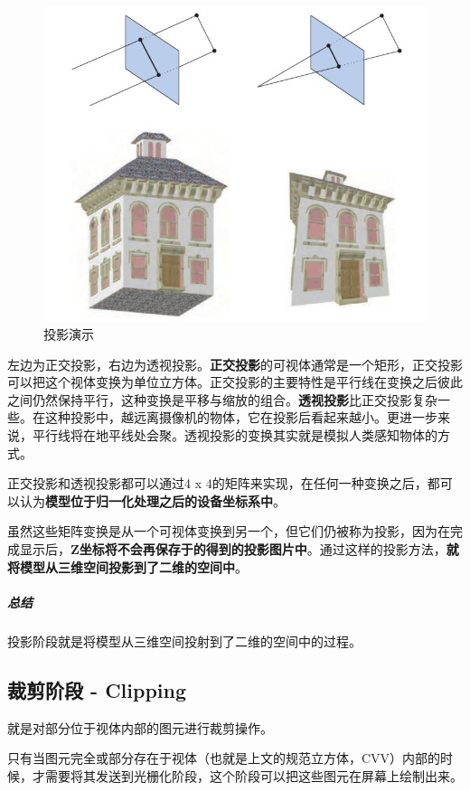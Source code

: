 \documentclass[UTF8,a4paper,12pt]{ctexbook}
\begin{document}
			\begin{figure}[H]
				\centering
				\includegraphics[scale=0.57]{project}
				\caption{投影演示}
			\end{figure}
			
			左边为正交投影，右边为透视投影。\textbf{正交投影}的可视体通常是一个矩形，正交投影可以把这个视体变换为单位立方体。正交投影的主要特性是平行线在变换之后彼此之间仍然保持平行，这种变换是平移与缩放的组合。\textbf{透视投影}比正交投影复杂一些。在这种投影中，越远离摄像机的物体，它在投影后看起来越小。更进一步来说，平行线将在地平线处会聚。透视投影的变换其实就是模拟人类感知物体的方式。
			
			正交投影和透视投影都可以通过4 x 4的矩阵来实现，在任何一种变换之后，都可以认为\textbf{模型位于归一化处理之后的设备坐标系中}。
			
			虽然这些矩阵变换是从一个可视体变换到另一个，但它们仍被称为投影，因为在完成显示后，\textbf{Z坐标将不会再保存于的得到的投影图片中}。通过这样的投影方法，\textbf{就将模型从三维空间投影到了二维的空间中}。
			
			\subparagraph{总结} 投影阶段就是将模型从三维空间投射到了二维的空间中的过程。
			
		\subsection{裁剪阶段 - Clipping} 
			就是对部分位于视体内部的图元进行裁剪操作。
			
			只有当图元完全或部分存在于视体（也就是上文的规范立方体，CVV）内部的时候，才需要将其发送到光栅化阶段，这个阶段可以把这些图元在屏幕上绘制出来。
			
\end{document}
